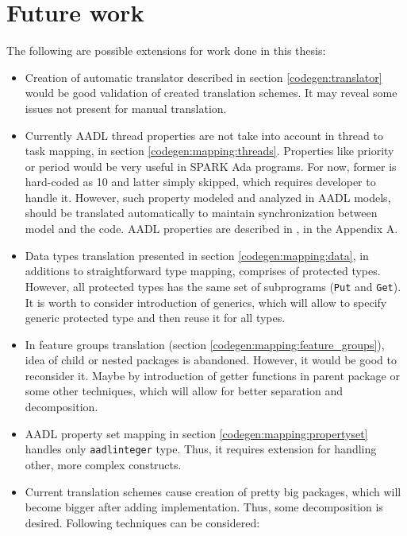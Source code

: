 
\cleardoublepage

\chapter{Future work}
\label{future_work}

The following are possible extensions for work done in this thesis:

\begin{itemize}
	\item Creation of automatic translator described in section \ref{codegen:translator} would be good validation of created translation schemes. It may reveal some issues not present for manual translation.
	\item Currently AADL thread properties are not take into account in thread to task mapping, in section \ref{codegen:mapping:threads}. Properties like priority or period would be very useful in SPARK Ada programs. For now, former is hard-coded as 10 and latter simply skipped, which requires developer to handle it. However, such property modeled and analyzed in AADL models, should be translated automatically to maintain synchronization between model and the code. AADL properties are described in \cite{AadlBook}, in the Appendix A.
	\item Data types translation presented in section \ref{codegen:mapping:data}, in additions to straightforward type mapping, comprises of protected types. However, all protected types has the same set of subprograms (\lstinline{Put} and \lstinline{Get}). It is worth to consider introduction of generics, which will allow to specify generic protected type and then reuse it for all types.
	\item In feature groups translation (section \ref{codegen:mapping:feature_groups}), idea of child or nested packages is abandoned. However, it would be good to reconsider it. Maybe by introduction of getter functions in parent package or some other techniques, which will allow for better separation and decomposition.
	\item AADL property set mapping in section \ref{codegen:mapping:propertyset} handles only \lstinline{aadlinteger} type. Thus, it requires extension for handling other, more complex constructs.
	\item Current translation schemes cause creation of pretty big packages, which will become bigger after adding implementation. Thus, some decomposition is desired. Following techniques can be considered: 

\end{itemize}
